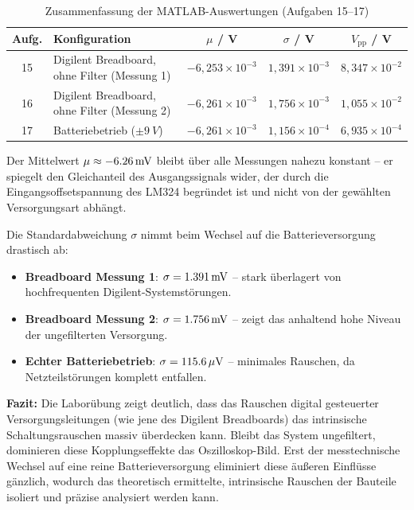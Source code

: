 \documentclass[12pt,a4paper]{article}
\begin{document}
\begin{table}[H]
  \centering
  \caption{Zusammenfassung der MATLAB-Auswertungen (Aufgaben 15--17)}
  \begin{tabular}{clccc}
    \toprule
    \textbf{Aufg.} & \textbf{Konfiguration}
      & $\mu$ / V & $\sigma$ / V & $V_\mathrm{pp}$ / V \\
    \midrule
    15 & Digilent Breadboard, ohne Filter (Messung 1)
       & $-6{,}253 \times 10^{-3}$
       & $1{,}391 \times 10^{-3}$
       & $8{,}347 \times 10^{-2}$ \\
    16 & Digilent Breadboard, ohne Filter (Messung 2)
       & $-6{,}261 \times 10^{-3}$
       & $1{,}756 \times 10^{-3}$
       & $1{,}055 \times 10^{-2}$ \\
    17 & Batteriebetrieb ($\pm\SI{9}{V}$)
       & $-6{,}261 \times 10^{-3}$
       & $1{,}156 \times 10^{-4}$
       & $6{,}935 \times 10^{-4}$ \\
    \bottomrule
  \end{tabular}
\end{table}

Der Mittelwert $\mu \approx -\SI{6{,}26}{mV}$ bleibt über alle Messungen
nahezu konstant -- er spiegelt den Gleichanteil des Ausgangssignals wider,
der durch die Eingangsoffsetspannung des LM324 begründet ist und nicht
von der gewählten Versorgungsart abhängt.

Die Standardabweichung $\sigma$ nimmt beim Wechsel auf die Batterieversorgung drastisch ab:

\begin{itemize}
  \item \textbf{Breadboard Messung 1}: $\sigma = \SI{1{,}391}{mV}$
        -- stark überlagert von hochfrequenten Digilent-Systemstörungen.
  \item \textbf{Breadboard Messung 2}: $\sigma = \SI{1{,}756}{mV}$
        -- zeigt das anhaltend hohe Niveau der ungefilterten Versorgung.
  \item \textbf{Echter Batteriebetrieb}: $\sigma = \SI{115{,}6}{\mu V}$
        -- minimales Rauschen, da Netzteilstörungen komplett entfallen.
\end{itemize}

\medskip
\noindent\textbf{Fazit:} Die Laborübung zeigt deutlich, dass das Rauschen 
digital gesteuerter Versorgungsleitungen (wie jene des Digilent Breadboards) 
das intrinsische Schaltungsrauschen massiv überdecken kann. Bleibt das System ungefiltert, 
dominieren diese Kopplungseffekte das Oszilloskop-Bild. Erst der messtechnische Wechsel 
auf eine reine Batterieversorgung eliminiert diese äußeren Einflüsse gänzlich, wodurch 
das theoretisch ermittelte, intrinsische Rauschen der Bauteile isoliert und präzise 
analysiert werden kann.
\end{document}
